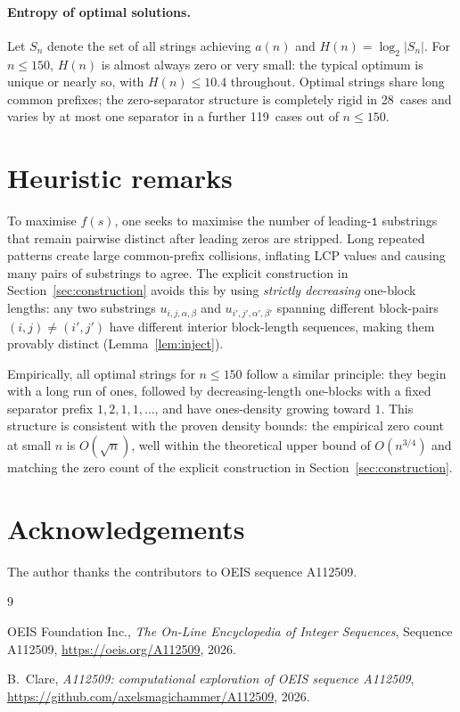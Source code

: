 ﻿\documentclass[11pt,a4paper]{article}
\theoremstyle{plain}
\theoremstyle{definition}
\theoremstyle{remark}
\begin{document}
\paragraph{Entropy of optimal solutions.}
Let $S_n$ denote the set of all strings achieving $a(n)$ and
$H(n)=\log_2|S_n|$.  For $n\le150$, $H(n)$ is almost always zero or
very small: the typical optimum is unique or nearly so, with
$H(n)\le10.4$ throughout.  Optimal strings share long common prefixes;
the zero-separator structure is completely rigid in 28~cases and varies
by at most one separator in a further 119~cases out of $n\le150$.

\section{Heuristic remarks}\label{sec:heuristic}

To maximise $f(s)$, one seeks to maximise the number of
leading-$\mathtt{1}$ substrings that remain pairwise distinct after
leading zeros are stripped.  Long repeated patterns create large
common-prefix collisions, inflating LCP values and causing many pairs
of substrings to agree.  The explicit construction in
Section~\ref{sec:construction} avoids this by using \emph{strictly
decreasing} one-block lengths: any two substrings $u_{i,j,\alpha,\beta}$
and $u_{i',j',\alpha',\beta'}$ spanning different block-pairs $(i,j)
\ne(i',j')$ have different interior block-length sequences, making them
provably distinct (Lemma~\ref{lem:inject}).

Empirically, all optimal strings for $n\le150$ follow a similar
principle: they begin with a long run of ones, followed by
decreasing-length one-blocks with a fixed separator prefix
$1,2,1,1,\ldots$, and have ones-density growing toward $1$.  This
structure is consistent with the proven density bounds: the empirical
zero count at small $n$ is $O(\sqrt{n})$, well within the theoretical
upper bound of $O(n^{3/4})$ and matching the zero count of the explicit
construction in Section~\ref{sec:construction}.

\section*{Acknowledgements}

The author thanks the contributors to OEIS sequence A112509.

\begin{thebibliography}{9}

  OEIS Foundation Inc.,
  \emph{The On-Line Encyclopedia of Integer Sequences},
  Sequence A112509,
  \url{https://oeis.org/A112509}, 2026.

  B.~Clare,
  \emph{A112509: computational exploration of OEIS sequence A112509},
  \url{https://github.com/axelsmagichammer/A112509}, 2026.

\end{thebibliography}
\end{document}
